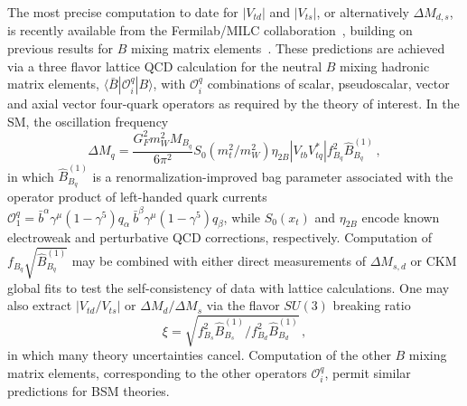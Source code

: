 The most precise computation to date for $|V_{td}|$ and $|V_{ts}|$, or alternatively $\Delta M_{d,s}$, is recently available from the Fermilab/MILC collaboration~\cite{Bazavov:2016nty}, building on previous results for $B$ mixing matrix elements~\cite{Aoki:2014nga,Carrasco:2013zta,Bazavov:2012zs,Albertus:2010nm,Gamiz:2009ku,Dalgic:2006gp}. These predictions are achieved via a three flavor lattice QCD  calculation for the neutral $B$ mixing hadronic matrix elements, $\langle \bar{B} | \mathcal{O}^q_i | B\rangle$, with $\mathcal{O}^q_i$ combinations of scalar, pseudoscalar, vector and axial vector four-quark operators as required by the theory of interest. In the SM, the oscillation frequency
\begin{equation}
	\label{eqn:SMDM}
	\Delta M_q = \frac{G_F^2 m_W^2 M_{B_q}}{6 \pi^2} S_0(m_t^2/m_W^2) \eta_{2 B}|V_{tb}V^*_{tq}| f_{B_q}^2 \hat{B}^{(1)}_{B_q}\,,
\end{equation}
in which $\hat{B}^{(1)}_{B_q}$ is a renormalization-improved bag parameter associated with the operator product of left-handed quark currents $\mathcal{O}^q_1 = \bar{b}^\alpha\gamma^\mu(1-\gamma^5) q_\alpha~\bar{b}^\beta \gamma^\mu(1-\gamma^5) q_\beta$, while $S_0(x_t)$ and $\eta_{2B}$ encode known electroweak and perturbative QCD corrections, respectively. Computation of $f_{B_q}\sqrt{\hat{B}^{(1)}_{B_q}}$ may be combined with either direct measurements of $\Delta M_{s,d}$ or CKM global fits to test the self-consistency of data with lattice calculations. One may also extract $|V_{td}/V_{ts}|$ or $\Delta M_d/\Delta M_s$ via the flavor $SU(3)$ breaking ratio 
\begin{equation}
\xi = \sqrt{f_{B_s}^2 \hat{B}^{(1)}_{B_s}/ f_{B_d}^2 \hat{B}^{(1)}_{B_d}}\,,
\end{equation}
in which many theory uncertainties cancel. Computation of the other $B$ mixing matrix elements, corresponding to the other operators $\mathcal{O}^q_i$, permit similar predictions for BSM theories.

